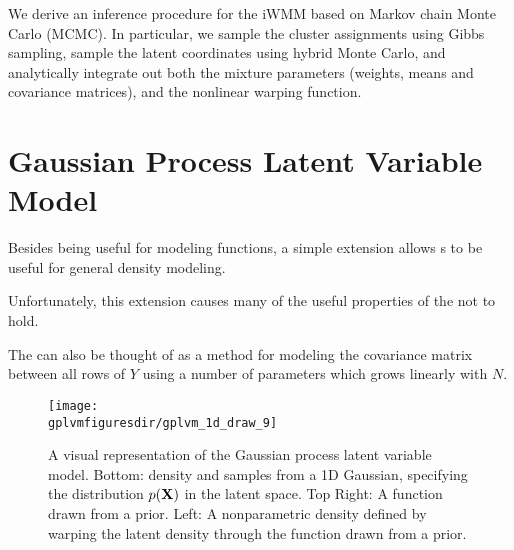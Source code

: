 We derive an inference procedure for the iWMM based on Markov chain Monte Carlo (MCMC).  In particular, we sample the cluster assignments using Gibbs sampling, sample the latent coordinates using hybrid Monte Carlo, and analytically integrate out both the mixture parameters (weights, means and covariance matrices), and the nonlinear warping function. 






\section{Gaussian Process Latent Variable Model}


Besides being useful for modeling functions, a simple extension allows \gp{}s to be useful for general density modeling.  



Unfortunately, this extension causes many of the useful properties of the \gp{} not to hold.

The \gplvm{} can also be thought of as a method for modeling the covariance matrix between all rows of $Y$ using a number of parameters which grows linearly with $N$.


\begin{figure}[t]
\begin{centering}
\texttt{[image: \\gplvmfiguresdir/gplvm\_1d\_draw\_9]}
\end{centering}
\caption[One-dimensional Gaussian process latent variable model]{A visual representation of the Gaussian process latent variable model.  Bottom: density and samples from a 1D Gaussian, specifying the distribution $p(\mathbf{X})$ in the latent space.  Top Right: A function drawn from a \gp{} prior.  Left: A nonparametric density defined by warping the latent density through the function drawn from a \gp{} prior.}  
\label{fig:oned-gplvm}
\end{figure}



